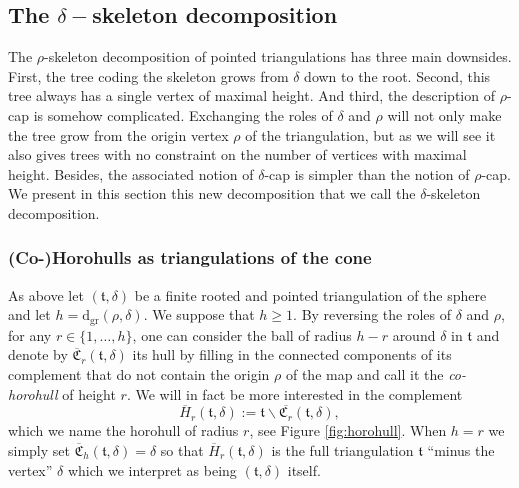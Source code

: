 \documentclass[10pt]{amsart}
\theoremstyle{definition}\newtheorem{defi}[theo]{Definition}\newtheorem{rema}[theo]{Remark}\newtheorem{exam}[theo]{Example}\newtheorem{exem}[theo]{Example}\newtheorem{nota}[theo]{Notation}
\begin{document}
\begin{center}
\end{center}

\subsection{The \texorpdfstring{$\delta-$}{delta-}skeleton decomposition}
\label{sec:skelretourne}

The $\rho$-skeleton decomposition of pointed triangulations has three main downsides. First, the tree coding the skeleton grows from $\delta$ down to the root.  Second, this tree always has a single vertex of maximal height. And third, the description of $\rho$-cap is somehow complicated. Exchanging the roles of $\delta$ and $\rho$ will not only make the tree grow from the origin vertex $\rho$ of the triangulation, but as we will see it also gives trees with no constraint on the number of vertices with maximal height. Besides, the associated notion of $\delta$-cap is simpler than the notion of $\rho$-cap. We present in this section this new decomposition that we call the $\delta$-skeleton decomposition.

\subsubsection{(Co-)Horohulls as triangulations of the cone}

As above let $( \mathfrak{t}, \delta)$ be a finite rooted and pointed triangulation of the sphere and let $h = \mathrm{d_{gr}}(\rho, \delta)$. We suppose that $h \geq 1$. By reversing the roles of $\delta$ and $\rho$, for any $r \in \{1, \ldots , h \}$, one can consider the ball of radius $h-r$ around $\delta$ in $\mathfrak t$ and denote by $ \overline{\mathfrak{C}}_{r}( \mathfrak{t}, \delta)$ its hull by filling in the connected components of its complement that do not contain the origin $\rho$ of the map and call it the \emph{co-horohull} of height $r$. We will in fact be more interested in the complement $$ \overline{H}_{r}( \mathfrak{t},\delta):= \mathfrak{t} \backslash \overline{\mathfrak{C}_{r}}( \mathfrak{t}, \delta),$$ which we name the horohull of radius $r$, see Figure \ref{fig:horohull}. When $h=r$ we simply set $ \overline{\mathfrak{C}}_h(\mathfrak t, \delta) = \delta$ so that $\overline{H}_{r}( \mathfrak{t},\delta)$ is the full triangulation $ \mathfrak{t}$ ``minus the vertex'' $\delta$ which we interpret as being $(  \mathfrak{t}, \delta)$ itself.
\end{document}
